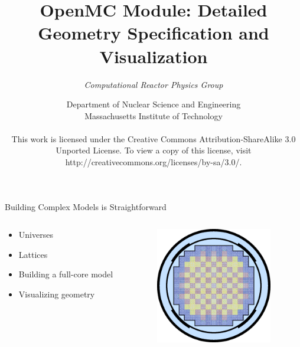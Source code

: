 \documentclass[serif]{beamer}
\title{OpenMC Module: Detailed Geometry Specification and Visualization}
\author{\emph{Computational Reactor Physics Group}}
\date{\normalsize Department of Nuclear Science and Engineering\\
                  Massachusetts Institute of Technology \\
~\\
\tiny{This work is licensed under the Creative Commons Attribution-ShareAlike 3.0 Unported License. To view a copy of this license, visit http://creativecommons.org/licenses/by-sa/3.0/.}}
\begin{document}

\frame{\titlepage}\logo{} %



\begin{frame}{Building Complex Models is Straightforward}
  \begin{columns}
    \begin{column}{0.5\linewidth}
      \begin{itemize}
        \item Universes
        \item Lattices
        \item Building a full-core model
        \item Visualizing geometry
      \end{itemize}
    \end{column}
    \begin{column}{0.5\linewidth}
      \centering
      \includegraphics[width=2in]{src/core.png}      
    \end{column}
  \end{columns}
\end{frame}












\end{document}
